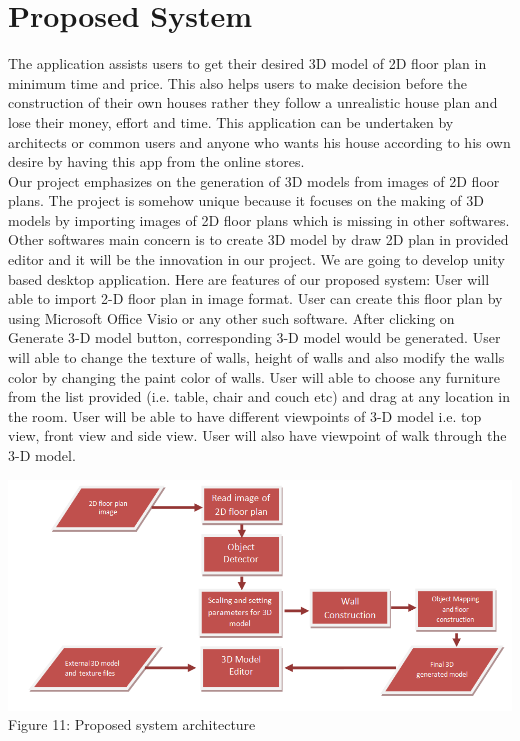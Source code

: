 \documentclass{article}
\begin{document}
\section{Proposed System}
The application assists users to get their desired 3D model of 2D floor plan in minimum time and price. This also helps users to make decision before the construction of their own houses rather they follow a unrealistic house plan and lose their money, effort and time. This application can be undertaken by architects or common users and anyone who wants his house according to his own desire by having this app from the online stores.
\\
Our project emphasizes on the generation of 3D models from images of 2D floor plans. The project is somehow unique because it focuses on the making of 3D models by importing images of 2D floor plans which is missing in other softwares. Other softwares main concern is to create 3D model by draw 2D plan in provided editor and it will be the innovation in our project. We are going to develop unity based desktop application. Here are features of our proposed system:
User will able to import 2-D floor plan in image format. User can create this floor plan by using Microsoft Office Visio or any other such software.
After clicking on Generate 3-D model button, corresponding 3-D model would be generated.
User will able to change the texture of walls, height of walls and also modify the walls color by changing the paint color of walls.
User will able to choose any furniture from the list provided (i.e. table, chair and couch etc) and drag at any location in the room.
User will be able to have different viewpoints of 3-D model i.e. top view, front view and side view. User will also have viewpoint of walk through the 3-D model.

\begin{center}
\includegraphics[scale=0.7]{diagram}
\\Figure 11: Proposed system architecture
\end{center}
\end{document}
